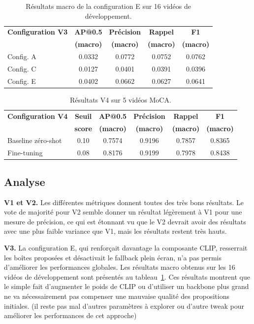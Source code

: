 \documentclass{article}
\begin{document}
\begin{table}[H]
\centering
\begin{tabular}{lcccc}
\hline
\textbf{Configuration V3} & \textbf{AP@0.5} & \textbf{Précision} & \textbf{Rappel} & \textbf{F1} \\
 & \textbf{(macro)} & \textbf{(macro)} & \textbf{(macro)} & \textbf{(macro)} \\
\hline
Config. A & 0.0332 & 0.0772 & 0.0752 & 0.0762 \\
Config. C & 0.0127 & 0.0401 & 0.0391 & 0.0396 \\
Config. E & 0.0402 & 0.0662 & 0.0627 & 0.0641 \\
\hline
\end{tabular}
\caption{Résultats macro de la configuration E sur 16 vidéos de développement.}
\label{tab:v3_results}
\end{table}

\begin{table}[H]
\centering
\begin{tabular}{lccccc}
\hline
\textbf{Configuration V4} & \textbf{Seuil} & \textbf{AP@0.5} & \textbf{Précision} & \textbf{Rappel} & \textbf{F1} \\
 & \textbf{score} & \textbf{(macro)} & \textbf{(macro)} & \textbf{(macro)} & \textbf{(macro)} \\
\hline
Baseline zéro-shot & 0.10 & 0.7574 & 0.9196 & 0.7857 & 0.8365 \\
Fine-tuning & 0.08 & 0.8176 & 0.9199 & 0.7978 & 0.8438 \\
\hline
\end{tabular}
\caption{Résultats V4 sur 5 vidéos MoCA.}
\end{table}

\subsection{Analyse}
\textbf{V1 et V2.}
Les différentes métriques donnent toutes des très bons résultats. Le vote de majorité pour V2 semble donner un résultat légèrement à V1 pour une mesure de précision, ce qui est étonnant vu que le V2 devrait avoir des résultats avec une plus faible variance que V1, mais les résultats restent très hauts. 

\textbf{V3.}
La configuration E, qui renforçait davantage la composante CLIP, resserrait les boîtes proposées et désactivait le fallback plein écran, n’a pas permis d’améliorer les performances globales. Les résultats macro obtenus sur les 16 vidéos de développement sont présentés au tableau~\ref{tab:v3_results}. Ces résultats montrent que le simple fait d’augmenter le poids de CLIP ou d’utiliser un backbone plus grand ne va nécessairement pas compenser une mauvaise qualité des propositions initiales. (il reste pas mal d'autres paramètres à explorer ou d'autre tweak pour améliorer les performances de cet approche)
\end{document}
